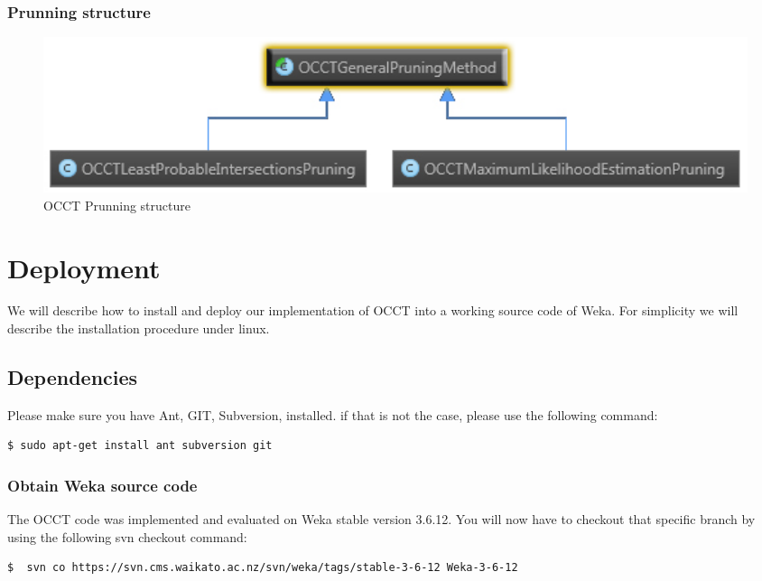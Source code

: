 \documentclass[a4paper,12pt]{article}
\begin{document}
\begin{spacing}{1.5}
\subsubsection{Prunning structure}
\begin{figure}[!h]
    \centering
\includegraphics[width=1\textwidth]{Figures/OCCTPruneStructure}
    \caption{OCCT Prunning structure}
    \label{fig:prunestr}
\end{figure}



\clearpage
\section{Deployment}
We will describe how to install and deploy our implementation of OCCT into a working source code of Weka.
For simplicity we will describe the installation procedure under linux.

\subsection{Dependencies}
Please make sure you have Ant, GIT, Subversion, installed.
if that is not the case, please use the following command:
\begin{lstlisting}[language=bash,frame=none,backgroundcolor=\color{anti-flashwhite}]
  $ sudo apt-get install ant subversion git
\end{lstlisting}
 
\subsubsection{Obtain Weka source code}
The OCCT code was implemented and evaluated on Weka stable version 3.6.12.
You will now have to checkout that specific branch by using the following svn checkout command:
 
\begin{lstlisting}[language=bash,frame=none,backgroundcolor=\color{anti-flashwhite}]
  $  svn co https://svn.cms.waikato.ac.nz/svn/weka/tags/stable-3-6-12 Weka-3-6-12
\end{lstlisting}


\end{spacing}
\end{document}
